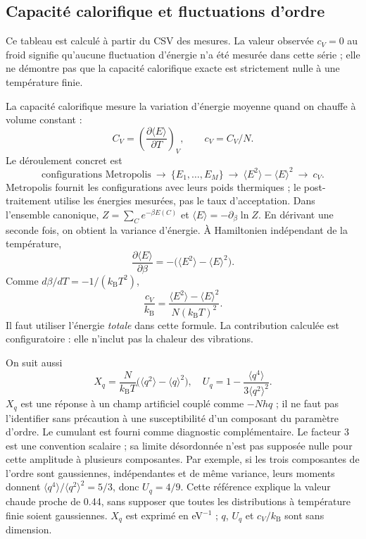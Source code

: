 \documentclass[10pt,a4paper]{article}
\newcommand{\kb}{k_{\mathrm B}}
\begin{document}
\subsection{Capacité calorifique et fluctuations d'ordre}

Ce tableau est calculé à partir du CSV des mesures. La valeur observée
$c_V=0$ au froid signifie qu'aucune fluctuation d'énergie n'a été mesurée
dans cette série ; elle ne démontre pas que la capacité calorifique exacte
est strictement nulle à une température finie.

La capacité calorifique mesure la variation d'énergie moyenne quand on
chauffe à volume constant :
\[
C_V=\left(\frac{\partial\langle E\rangle}{\partial T}\right)_V,
\qquad c_V=C_V/N.
\]
Le déroulement concret est
\[
\text{configurations Metropolis}\ \longrightarrow\
\{E_1,\ldots,E_M\}\ \longrightarrow\
\langle E^2\rangle-\langle E\rangle^2\ \longrightarrow\ c_V.
\]
Metropolis fournit les configurations avec leurs poids thermiques ; le
post-traitement utilise les énergies mesurées, pas le taux d'acceptation.
Dans l'ensemble canonique,
$Z=\sum_C e^{-\beta E(C)}$ et $\langle E\rangle=-\partial_\beta\ln Z$.
En dérivant une seconde fois, on obtient la variance d'énergie.
À Hamiltonien indépendant de la température,
\[
\frac{\partial\langle E\rangle}{\partial\beta}
=-\big(\langle E^2\rangle-\langle E\rangle^2\big).
\]
Comme $d\beta/dT=-1/(\kb T^2)$,
\begin{equation}
\boxed{\frac{c_V}{\kb}=
\frac{\langle E^2\rangle-\langle E\rangle^2}{N(\kb T)^2}.}
\end{equation}
Il faut utiliser l'énergie \emph{totale} dans cette formule. La contribution
calculée est configuratoire : elle n'inclut pas la chaleur des vibrations.

On suit aussi
\[
X_q=\frac{N}{\kb T}\big(\langle q^2\rangle-\langle q\rangle^2\big),
\quad
U_q=1-\frac{\langle q^4\rangle}{3\langle q^2\rangle^2}.
\]
$X_q$ est une réponse à un champ artificiel couplé comme $-Nhq$ ; il ne
faut pas l'identifier sans précaution à une susceptibilité d'un composant
du paramètre d'ordre. Le cumulant est fourni comme diagnostic complémentaire.
Le facteur $3$ est une convention scalaire ; sa limite désordonnée n'est
pas supposée nulle pour cette amplitude à plusieurs composantes.
Par exemple, si les trois composantes de l'ordre sont gaussiennes,
indépendantes et de même variance, leurs moments donnent
$\langle q^4\rangle/\langle q^2\rangle^2=5/3$, donc $U_q=4/9$.
Cette référence explique la valeur chaude proche de 0.44, sans supposer
que toutes les distributions à température finie soient gaussiennes.
$X_q$ est exprimé en eV$^{-1}$ ; $q$, $U_q$ et $c_V/\kb$ sont sans dimension.
\end{document}
